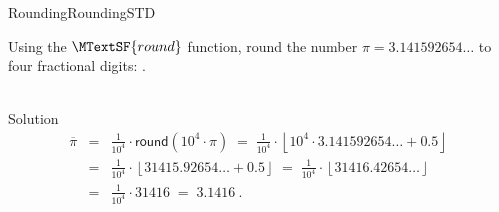 \begin{MXContent}{Rounding}{Rounding}{STD}
\begin{MExercise}
Using the $\MTextSF{round}$ function, round the number $\pi=3.141592654\ldots$ to four fractional digits:
.
\ \\ \ \\
\begin{MHint}{Solution}
\begin{eqnarray*}
\overline{\pi} & = & \frac{1}{10^{4}}\cdot \mathsf{round}(10^{4}\cdot \pi)\; =\; \frac{1}{10^{4}}\cdot \left\lfloor{ 10^{4}\cdot 3.141592654\ldots + 0.5 }\right\rfloor \ \\
& = & \frac{1}{10^{4}}\cdot \left\lfloor{ 31415.92654\ldots+0.5}\right\rfloor \;=\; \frac{1}{10^{4}}\cdot \left\lfloor{ 31416.42654\ldots }\right\rfloor\ \\
& = & \frac{1}{10^{4}}\cdot 31416\; =\;  3.1416\: .
\end{eqnarray*}
\end{MHint}
\end{MExercise}



\end{MXContent}
